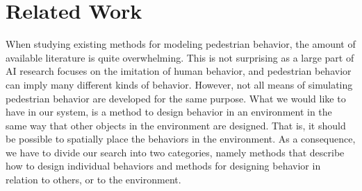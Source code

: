 \documentclass[11pt, a4paper]{book}
\begin{document}


\chapter{Related Work}
When studying existing methods for modeling pedestrian behavior, the amount of available literature is quite overwhelming. This is not surprising as a large part of AI research focuses on the imitation of human behavior, and pedestrian behavior can imply many different kinds of behavior. However, not all means of simulating pedestrian behavior are developed for the same purpose. What we would like to have in our system, is a method to design behavior in an environment in the same way that other objects in the environment are designed. That is, it should be possible to spatially place the behaviors in the environment. As a consequence, we have to divide our search into two categories, namely methods that describe how to design individual behaviors and methods for designing behavior in relation to others, or to the environment.
\end{document}
